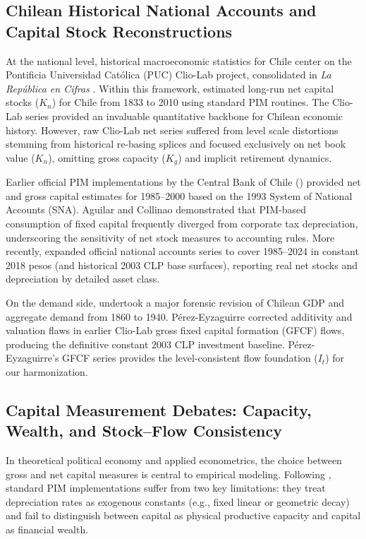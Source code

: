 \subsection{Chilean Historical National Accounts and Capital Stock Reconstructions}
At the national level, historical macroeconomic statistics for Chile center on the Pontificia Universidad Católica (PUC) Clio-Lab project, consolidated in \emph{La República en Cifras} \citep{Luders2016}. Within this framework, \citet{DiazWagner2016} estimated long-run net capital stocks ($K_n$) for Chile from 1833 to 2010 using standard PIM routines. The Clio-Lab series provided an invaluable quantitative backbone for Chilean economic history. However, raw Clio-Lab net series suffered from level scale distortions stemming from historical re-basing splices and focused exclusively on net book value ($K_n$), omitting gross capacity ($K_g$) and implicit retirement dynamics.

Earlier official PIM implementations by the Central Bank of Chile (\citealt{Aguilar2001}) provided net and gross capital estimates for 1985--2000 based on the 1993 System of National Accounts (SNA). Aguilar and Collinao demonstrated that PIM-based consumption of fixed capital frequently diverged from corporate tax depreciation, underscoring the sensitivity of net stock measures to accounting rules. More recently, \citet{BCCH2024} expanded official national accounts series to cover 1985--2024 in constant 2018 pesos (and historical 2003 CLP base surfaces), reporting real net stocks and depreciation by detailed asset class.

On the demand side, \citet{PerezEyzaguirre2019} undertook a major forensic revision of Chilean GDP and aggregate demand from 1860 to 1940. Pérez-Eyzaguirre corrected additivity and valuation flaws in earlier Clio-Lab gross fixed capital formation (GFCF) flows, producing the definitive constant 2003 CLP investment baseline. Pérez-Eyzaguirre's GFCF series provides the level-consistent flow foundation ($I_t$) for our harmonization.

\subsection{Capital Measurement Debates: Capacity, Wealth, and Stock--Flow Consistency}
In theoretical political economy and applied econometrics, the choice between gross and net capital measures is central to empirical modeling. Following \citet{Shaikh2016}, standard PIM implementations suffer from two key limitations: they treat depreciation rates as exogenous constants (e.g., fixed linear or geometric decay) and fail to distinguish between capital as physical productive capacity and capital as financial wealth.

